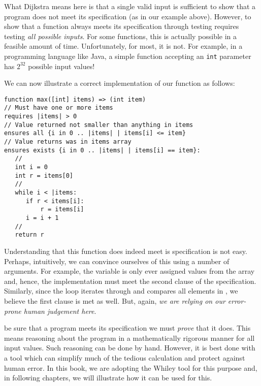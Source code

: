 What Dijkstra means here is that a single valid input is sufficient to show that a program does not meet its specification (as in our example above).  However, to show that a function always meets its specification through testing requires testing {\em all possible inputs}.  For some functions, this is actually possible in a feasible amount of time.  Unfortunately, for most, it is not.  For example, in a programming language like Java, a simple function accepting an \lstinline{int} parameter has $2^{32}$ possible input values!

\begin{eg} We can now illustrate a correct implementation of our  function as follows:

\begin{lstlisting}
function max([int] items) => (int item) 
// Must have one or more items
requires |items| > 0
// Value returned not smaller than anything in items
ensures all {i in 0 .. |items| | items[i] <= item}
// Value returns was in items array
ensures exists {i in 0 .. |items| | items[i] == item}:
   //
   int i = 0
   int r = items[0]
   //
   while i < |items:
      if r < items[i]:
          r = items[i]
      i = i + 1
   //
   return r
\end{lstlisting}

Understanding that this function does indeed meet is specification is not easy.  Perhaps, intuitively, we can convince ourselves of this using a number of arguments.  For example, the variable  is only ever assigned values from the  array and, hence, the implementation must meet the second  clause of the specification.  Similarly, since the loop iterates through and compares all elements in , we believe the first  clause is met as well.  But, again, {\em we are relying on our error-prone human judgement here}.  
\end{eg}

 be sure that a program meets its specification we must {\em prove} that it does.  This means reasoning about the program in a mathematically rigorous manner for all input values.  Such reasoning can be done by hand.  However, it is best done with a tool which can simplify much of the tedious calculation and protect against human error.  In this book, we are adopting the Whiley tool for this purpose and, in following chapters, we will illustrate how it can be used for this.

